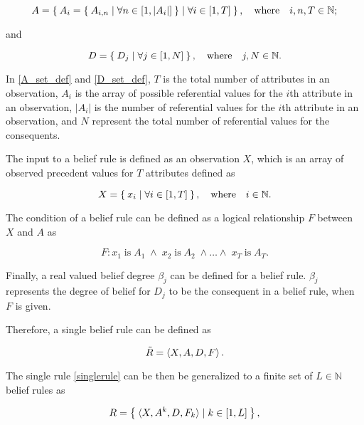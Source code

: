 \begin{equation}
\label{A_set_def}
    A = \Set{ A_i = \Set{A_{i, n} \mid \forall n \in \left[1, \left|A_i\right| \right]}
    \mid \forall i \in \left[1, T \right] }, \quad\text{where}\quad i, n, T \in \mathbb{N};
\end{equation}

and

\begin{equation}
\label{D_set_def}
    D = \Set{D_j \mid \forall j \in \left[1, N \right] }, \quad\text{where}\quad j, N \in \mathbb{N}.
\end{equation}

In \eqref{A_set_def} and \eqref{D_set_def}, $T$ is the total number of attributes in an observation, $A_i$ is the array of possible  referential values
for the $i$th attribute in an observation,  $\left|A_i\right|$ is the number of referential values for the $i$th attribute in an observation,
and $N$ represent the total number of referential values for the consequents.

The input to a belief rule is defined as an observation $X$, which is an array of observed precedent values
for $T$ attributes defined as

\begin{equation}
    X = \Set{ x_i \mid \forall i \in \left[1, T \right]}, \quad\text{where}\quad i \in \mathbb{N}.
\end{equation}

The condition of a belief rule can be defined as a logical relationship $F$ between $X$ and $A$ as

\begin{equation}
    F : x_1\;\text{is}\;A_1\;\land\;x_2\;\text{is}\;A_2\;\land\dots\land\;x_T\;\text{is}\;A_T.
\end{equation}

Finally, a real valued belief degree $\beta_j$ can be defined for a belief rule. $\beta_j$ represents the degree of belief for $D_j$ to be the consequent
in a belief rule, when $F$ is given.

Therefore, a single belief rule can be defined as

\begin{equation}
\label{singlerule}
    \tilde{R} = \braket{X, A, D, F}{}.
\end{equation}

The single rule \eqref{singlerule} can be then be generalized to a finite set of $L \in \mathbb{N}$ belief rules as

\begin{equation}
    R = \Set{ \braket{X, A^k, D, F_k} \mid k \in \left[1, L \right]},
\end{equation}

